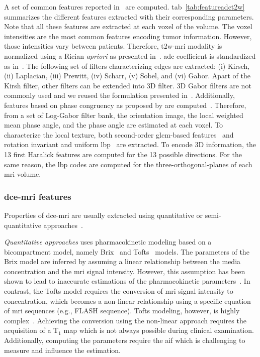 \documentclass[a4paper,num-refs]{wiley-article}
\begin{document}
A set of common features reported in~\cite{lemaitre2015computer} are
computed. \Acl{tab}~\ref{tab:featureadct2w} summarizes the different features
extracted with their corresponding parameters. Note that all these features are
extracted at each voxel of the volume. The voxel intensities are the most
common features encoding tumor information. However, those intensities vary
between patients. Therefore, \ac{t2w}-\ac{mri} modality is normalized using a
Rician \emph{apriori} as presented
in~\cite{lemaitre2016normalization}. \Ac{adc} coefficient is standardized as
in~\cite{Nyul1999}. The following set of filters characterizing edges are
extracted: (i) Kirsch, (ii) Laplacian, (iii) Prewitt, (iv) Scharr, (v) Sobel,
and (vi) Gabor. Apart of the Kirsh filter, other filters can be extended into
3D filter. 3D Gabor filters are not commonly used and we reused the formulation
presented in~\cite{wang2005face}. Additionally, features based on phase
congruency as proposed by \citeauthor{kovesi1999image} are
computed~\cite{kovesi1999image}. Therefore, from a set of Log-Gabor filter
bank, the orientation image, the local weighted mean phase angle, and the phase
angle are estimated at each voxel. To characterize the local texture, both
second-order \ac{glcm}-based features~\cite{Haralick1973} and rotation
invariant and uniform \ac{lbp}~\cite{ojala2002multiresolution} are
extracted. To encode 3D information, the 13 first Haralick features are
computed for the 13 possible directions. For the same reason, the \ac{lbp}
codes are computed for the three-orthogonal-planes of each \ac{mri} volume.

\subsubsection{\acs*{dce}-\acs*{mri} features}

Properties of \ac{dce}-\ac{mri} are usually extracted using quantitative or
semi-quantitative approaches~\cite{lemaitre2015computer}.

\emph{Quantitative approaches} uses pharmacokinetic modeling based on a
bicompartment model, namely Brix~\cite{brix1991pharmacokinetic} and
Tofts~\cite{tofts1995quantitative} models. The parameters of the Brix model
are inferred by assuming a linear relationship between the media concentration
and the \ac{mri} signal intensity. However, this assumption has been shown to
lead to inaccurate estimations of the pharmacokinetic
parameters~\cite{heilmann2006determination}. In contrast, the Tofts model
requires the conversion of \ac{mri} signal intensity to concentration, which
becomes a non-linear relationship using a specific equation of \ac{mri}
sequences (e.g., FLASH sequence). Tofts modeling, however, is highly
complex~\cite{gliozzi2011phenomenological}. Achieving the conversion using the
non-linear approach requires the acquisition of a T$_1$ map which is not always
possible during clinical examination. Additionally, computing the parameters
require the \ac{aif} which is challenging to measure and influence the estimation.
\end{document}
